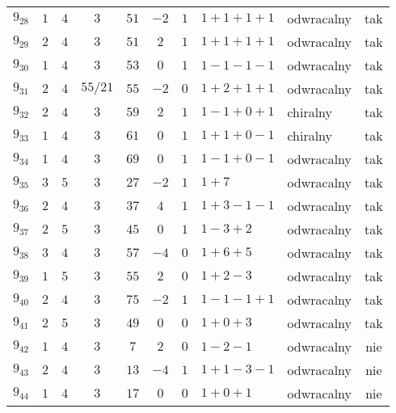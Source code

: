 \begin{longtable}{lccccccllc}
$9_{28}$    &  $1$     &  $4$  &  $3$      &  $51$   &  $-2$  &  $1$  &  $1+1+1+1$      &  odwracalny  &  tak  \\
$9_{29}$    &  $2$     &  $4$  &  $3$      &  $51$   &  $2$   &  $1$  &  $1+1+1+1$      &  odwracalny  &  tak  \\
$9_{30}$    &  $1$     &  $4$  &  $3$      &  $53$   &  $0$   &  $1$  &  $1-1-1-1$      &  odwracalny  &  tak  \\
$9_{31}$    &  $2$     &  $4$  &  $55/21$  &  $55$   &  $-2$  &  $0$  &  $1+2+1+1$      &  odwracalny  &  tak  \\
$9_{32}$    &  $2$     &  $4$  &  $3$      &  $59$   &  $2$   &  $1$  &  $1-1+0+1$      &  chiralny    &  tak  \\
$9_{33}$    &  $1$     &  $4$  &  $3$      &  $61$   &  $0$   &  $1$  &  $1+1+0-1$      &  chiralny    &  tak  \\
$9_{34}$    &  $1$     &  $4$  &  $3$      &  $69$   &  $0$   &  $1$  &  $1-1+0-1$      &  odwracalny  &  tak  \\
$9_{35}$    &  $3$     &  $5$  &  $3$      &  $27$   &  $-2$  &  $1$  &  $1+7$          &  odwracalny  &  tak  \\
$9_{36}$    &  $2$     &  $4$  &  $3$      &  $37$   &  $4$   &  $1$  &  $1+3-1-1$      &  odwracalny  &  tak  \\
$9_{37}$    &  $2$     &  $5$  &  $3$      &  $45$   &  $0$   &  $1$  &  $1-3+2$        &  odwracalny  &  tak  \\
$9_{38}$    &  $3$     &  $4$  &  $3$      &  $57$   &  $-4$  &  $0$  &  $1+6+5$        &  odwracalny  &  tak  \\
$9_{39}$    &  $1$     &  $5$  &  $3$      &  $55$   &  $2$   &  $0$  &  $1+2-3$        &  odwracalny  &  tak  \\
$9_{40}$    &  $2$     &  $4$  &  $3$      &  $75$   &  $-2$  &  $1$  &  $1-1-1+1$      &  odwracalny  &  tak  \\
$9_{41}$    &  $2$     &  $5$  &  $3$      &  $49$   &  $0$   &  $0$  &  $1+0+3$        &  odwracalny  &  tak  \\
$9_{42}$    &  $1$     &  $4$  &  $3$      &  $7$    &  $2$   &  $0$  &  $1-2-1$        &  odwracalny  &  nie  \\
$9_{43}$    &  $2$     &  $4$  &  $3$      &  $13$   &  $-4$  &  $1$  &  $1+1-3-1$      &  odwracalny  &  nie  \\
$9_{44}$    &  $1$     &  $4$  &  $3$      &  $17$   &  $0$   &  $0$  &  $1+0+1$        &  odwracalny  &  nie  \\

\end{longtable}
